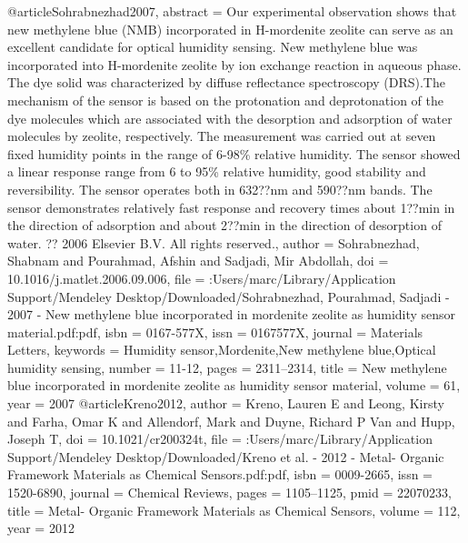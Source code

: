@article{Sohrabnezhad2007,
abstract = {Our experimental observation shows that new methylene blue (NMB) incorporated in H-mordenite zeolite can serve as an excellent candidate for optical humidity sensing. New methylene blue was incorporated into H-mordenite zeolite by ion exchange reaction in aqueous phase. The dye solid was characterized by diffuse reflectance spectroscopy (DRS).The mechanism of the sensor is based on the protonation and deprotonation of the dye molecules which are associated with the desorption and adsorption of water molecules by zeolite, respectively. The measurement was carried out at seven fixed humidity points in the range of 6-98{\%} relative humidity. The sensor showed a linear response range from 6 to 95{\%} relative humidity, good stability and reversibility. The sensor operates both in 632??nm and 590??nm bands. The sensor demonstrates relatively fast response and recovery times about 1??min in the direction of adsorption and about 2??min in the direction of desorption of water. ?? 2006 Elsevier B.V. All rights reserved.},
author = {Sohrabnezhad, Shabnam and Pourahmad, Afshin and Sadjadi, Mir Abdollah},
doi = {10.1016/j.matlet.2006.09.006},
file = {:Users/marc/Library/Application Support/Mendeley Desktop/Downloaded/Sohrabnezhad, Pourahmad, Sadjadi - 2007 - New methylene blue incorporated in mordenite zeolite as humidity sensor material.pdf:pdf},
isbn = {0167-577X},
issn = {0167577X},
journal = {Materials Letters},
keywords = {Humidity sensor,Mordenite,New methylene blue,Optical humidity sensing},
number = {11-12},
pages = {2311--2314},
title = {{New methylene blue incorporated in mordenite zeolite as humidity sensor material}},
volume = {61},
year = {2007}
}
@article{Kreno2012,
author = {Kreno, Lauren E and Leong, Kirsty and Farha, Omar K and Allendorf, Mark and Duyne, Richard P Van and Hupp, Joseph T},
doi = {10.1021/cr200324t},
file = {:Users/marc/Library/Application Support/Mendeley Desktop/Downloaded/Kreno et al. - 2012 - Metal- Organic Framework Materials as Chemical Sensors.pdf:pdf},
isbn = {0009-2665},
issn = {1520-6890},
journal = {Chemical Reviews},
pages = {1105--1125},
pmid = {22070233},
title = {{Metal- Organic Framework Materials as Chemical Sensors}},
volume = {112},
year = {2012}
}
